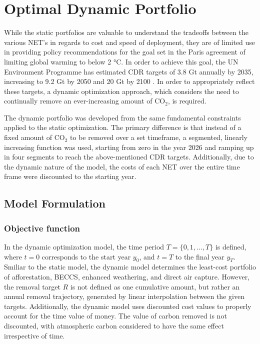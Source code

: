 \section{Optimal Dynamic Portfolio}

While the static portfolios are valuable to understand the tradeoffs between the various NET's in regards to cost and speed of deployment, they are of limited use in providing policy recommendations for the goal set in the Paris agreement of limiting global warming to below 2 °C. In order to achieve this goal, the UN Environment Programme has estimated CDR targets of 3.8 Gt annually by 2035, increasing to 9.2 Gt by 2050 and 20 Gt by 2100 \parencite{unep_emissions_2023}. In order to appropriately reflect these targets, a dynamic optimization approach, which considers the need to continually remove an ever-increasing amount of CO$_2$, is required.\vspace{2mm}

The dynamic portfolio was developed from the same fundamental constraints applied to the static optimization. The primary difference is that instead of a fixed amount of CO$_2$ to be removed over a set timeframe, a segmented, linearly increasing function was used, starting from zero in the year 2026 and ramping up in four segments to reach the above-mentioned CDR targets. Additionally, due to the dynamic nature of the model, the costs of each NET over the entire time frame were discounted to the starting year.\vspace{2mm}

\subsection{Model Formulation}
\subsubsection{Objective function}
In the dynamic optimization model, the time period $ T =  \{0,1,...,T\} $ is defined, where $t=0$ corresponds to the start year $y_0$, and $t=T$ to the final year $y_T$. Smiliar to the static model, the dynamic model determines the least-cost portfolio of afforestation, BECCS, enhanced weathering, and direct air capture. However, the removal target $R$ is not defined as one cumulative amount, but rather an annual removal trajectory, generated by linear interpolation between the given targets. Additionally, the dynamic model uses discounted cost values to properly account for the time value of money. The value of carbon removed is not discounted, with atmospheric carbon considered to have the same effect irrespective of time.\vspace{2mm}

